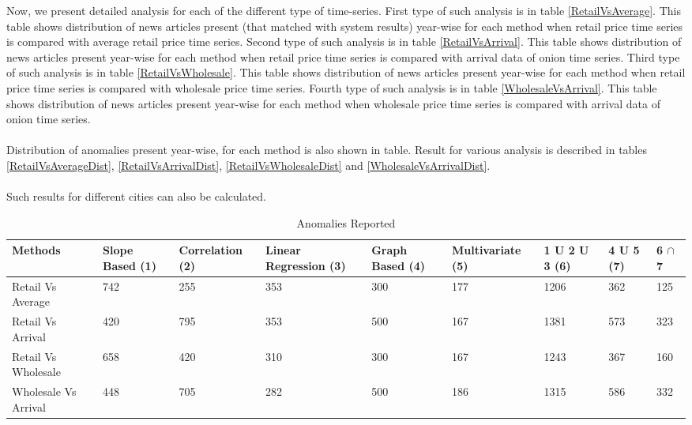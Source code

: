 \documentclass[a4paper,10pt]{report}
\begin{document}
Now, we present detailed analysis for each of the different type of time-series. First type of such analysis is in table \ref{RetailVsAverage}. This table shows distribution of news articles present (that matched with system results) year-wise for each method when retail price time series is compared with average retail price time series. Second type of such analysis is in table \ref{RetailVsArrival}. This table shows distribution of news articles present year-wise for each method when retail price time series is compared with arrival data of onion time series. Third type of such analysis is in table \ref{RetailVsWholesale}. This table shows distribution of news articles present year-wise for each method when retail price time series is compared with wholesale price time series. Fourth type of such analysis is in table \ref{WholesaleVsArrival}. This table shows distribution of news articles present year-wise for each method when wholesale price time series is compared with arrival data of onion time series.\\
\\
Distribution of anomalies present year-wise, for each method is also shown in table. Result for various analysis is described in tables  \ref{RetailVsAverageDist}, \ref{RetailVsArrivalDist}, \ref{RetailVsWholesaleDist} and \ref{WholesaleVsArrivalDist}.\\
\\
Such results for different cities can also be calculated.

  
	\begin{table}[]
	\centering
	
	\resizebox{\textwidth}{!}
	{\begin{tabular}{|l|l|l|l|l|l|l|l|l|}
	\hline
	Methods              & Slope Based (1) & Correlation (2) & Linear Regression (3) & Graph Based (4) & Multivariate (5) & 1 U 2 U 3 (6) & 4 U 5 (7) & 6 $\cap$ 7  \\
	\hline
	Retail Vs Average    & 742 & 255 & 353 & 300 & 177 & 1206 & 362 & 125 \\
	\hline
	Retail Vs Arrival    & 420 & 795 & 353 & 500 & 167 & 1381 & 573 & 323 \\
	\hline
	Retail Vs Wholesale  & 658 & 420 & 310 & 300 & 167 & 1243 & 367 & 160 \\
	\hline
	Wholesale Vs Arrival & 448 & 705 & 282 & 500 & 186 & 1315 & 586 & 332 \\
	\hline
	\end{tabular}}
	\caption{Anomalies Reported}
	\label{AnomaliesReported}
	\end{table}
      
\end{document}
